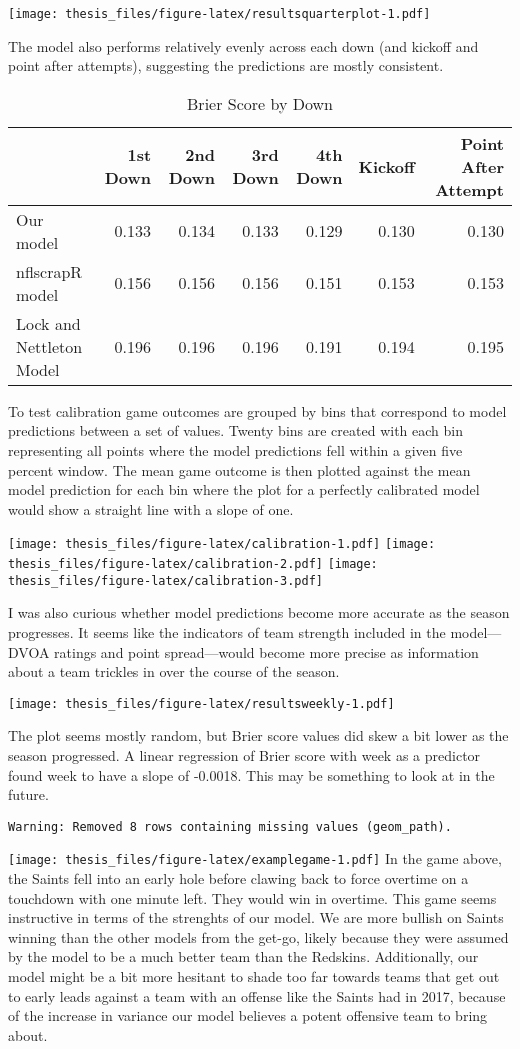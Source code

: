 \documentclass[12pt,twoside]{dukestatscithesis}
\begin{document}
\texttt{[image: thesis\_files/figure-latex/resultsquarterplot-1.pdf]}

The model also performs relatively evenly across each down (and kickoff and point after attempts), suggesting the predictions are mostly consistent.
\begin{longtable}[t]{lrrrrrr}
\caption{\label{tab:resultsdown}Brier Score by Down}\\
\toprule
  & 1st Down & 2nd Down & 3rd Down & 4th Down & Kickoff & Point After Attempt\\
\midrule
Our model & 0.133 & 0.134 & 0.133 & 0.129 & 0.130 & 0.130\\
nflscrapR model & 0.156 & 0.156 & 0.156 & 0.151 & 0.153 & 0.153\\
Lock and Nettleton Model & 0.196 & 0.196 & 0.196 & 0.191 & 0.194 & 0.195\\
\bottomrule
\end{longtable}
To test calibration game outcomes are grouped by bins that correspond to model predictions between a set of values. Twenty bins are created with each bin representing all points where the model predictions fell within a given five percent window. The mean game outcome is then plotted against the mean model prediction for each bin where the plot for a perfectly calibrated model would show a straight line with a slope of one.

\texttt{[image: thesis\_files/figure-latex/calibration-1.pdf]} \texttt{[image: thesis\_files/figure-latex/calibration-2.pdf]} \texttt{[image: thesis\_files/figure-latex/calibration-3.pdf]}

I was also curious whether model predictions become more accurate as the season progresses. It seems like the indicators of team strength included in the model---DVOA ratings and point spread---would become more precise as information about a team trickles in over the course of the season.

\texttt{[image: thesis\_files/figure-latex/resultsweekly-1.pdf]}

The plot seems mostly random, but Brier score values did skew a bit lower as the season progressed. A linear regression of Brier score with week as a predictor found week to have a slope of -0.0018. This may be something to look at in the future.
\begin{verbatim}
Warning: Removed 8 rows containing missing values (geom_path).
\end{verbatim}
\texttt{[image: thesis\_files/figure-latex/examplegame-1.pdf]}
In the game above, the Saints fell into an early hole before clawing back to force overtime on a touchdown with one minute left. They would win in overtime. This game seems instructive in terms of the strenghts of our model. We are more bullish on Saints winning than the other models from the get-go, likely because they were assumed by the model to be a much better team than the Redskins. Additionally, our model might be a bit more hesitant to shade too far towards teams that get out to early leads against a team with an offense like the Saints had in 2017, because of the increase in variance our model believes a potent offensive team to bring about.
\end{document}
